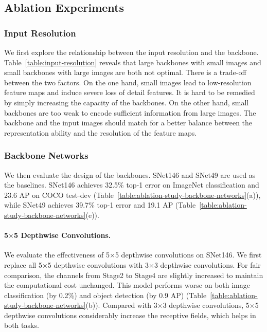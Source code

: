 \subsection{Ablation Experiments}

\subsubsection{Input Resolution}
\label{section:ablation-study-input-resolution}

We first explore the relationship between the input resolution and the backbone.
Table~\ref{table:input-resolution} reveals that large backbones with small images and small backbones with large images are both not optimal.
There is a trade-off between the two factors.
On the one hand, small images lead to low-resolution feature maps and induce severe loss of detail features.
It is hard to be remedied by simply increasing the capacity of the backbones.
On the other hand, small backbones are too weak to encode sufficient information from large images.
The backbone and the input images should match for a better balance between the representation ability and the resolution of the feature maps.

\vspace{-5pt}
\subsubsection{Backbone Networks}
\label{section:ablation-study-backbone-networks}

We then evaluate the design of the backbones.
SNet146 and SNet49 are used as the baselines.
SNet146 achieves 32.5\% top-1 error on ImageNet classification and 23.6 AP on COCO test-dev (Table~\ref{table:ablation-study-backbone-networks}(a)), while SNet49 achieves 39.7\% top-1 error and 19.1 AP (Table~\ref{table:ablation-study-backbone-networks}(e)).

\vspace{-12pt}
\paragraph{5$\times$5 Depthwise Convolutions.}

We evaluate the effectiveness of 5$\times$5 depthwise convolutions on SNet146.
We first replace all 5$\times$5 depthwise convolutions with 3$\times$3 depthwise convolutions.
For fair comparison, the channels from Stage2 to Stage4 are slightly increased to maintain the computational cost unchanged.
This model performs worse on both image classification (by 0.2\%) and object detection (by 0.9 AP) (Table~\ref{table:ablation-study-backbone-networks}(b)).
Compared with 3$\times$3 depthwise convolutions, 5$\times$5 depthwise convolutions considerably increase the receptive fields, which helps in both tasks.

